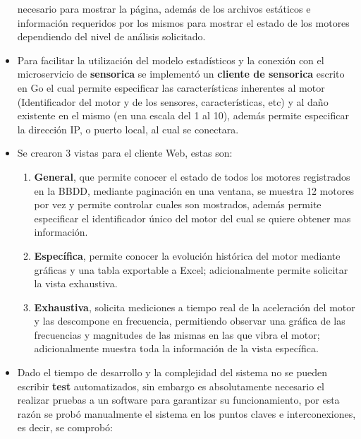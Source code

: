 \begin{itemize}
        necesario para mostrar la página, además de los archivos estáticos e
        información requeridos por los mismos para mostrar el estado de los motores
        dependiendo del nivel de análisis solicitado.
    \item Para facilitar la utilización del modelo estadísticos y la conexión con
        el microservicio de \textbf{sensorica} se implementó un \textbf{cliente de
        sensorica} escrito en Go el cual permite especificar las características
        inherentes al motor (Identificador del motor y de los sensores, características, etc)
        y al daño existente en el mismo (en una escala del 1 al 10), además permite
        especificar la dirección IP, o puerto local, al cual se conectara.
    \item Se crearon 3 vistas para el cliente Web, estas son:
        \begin{enumerate}
            \item \textbf{General}, que permite conocer el estado de todos
                los motores registrados en la BBDD, mediante paginación
                en una ventana, se muestra 12 motores por vez y permite controlar
                cuales son mostrados,
                además permite especificar el identificador
                único del motor del cual se quiere obtener mas información.
            \item \textbf{Específica},
                permite conocer la evolución histórica del motor mediante gráficas
                y una tabla exportable a Excel; adicionalmente permite solicitar
                la vista exhaustiva.
            \item \textbf{Exhaustiva},
                solicita mediciones a tiempo real de la aceleración del motor
                y las descompone en frecuencia, permitiendo observar una gráfica
                de las frecuencias y magnitudes de las mismas en las que vibra
                el motor; adicionalmente muestra toda la información de la
                vista específica.
        \end{enumerate}
    \item Dado el tiempo de desarrollo y la complejidad del sistema no se
        pueden escribir \textbf{test} automatizados, sin embargo es absolutamente
        necesario el realizar pruebas a un software para garantizar su funcionamiento,
        por esta razón se probó manualmente el sistema en los puntos claves
        e interconexiones, es decir, se comprobó:

\end{itemize}
